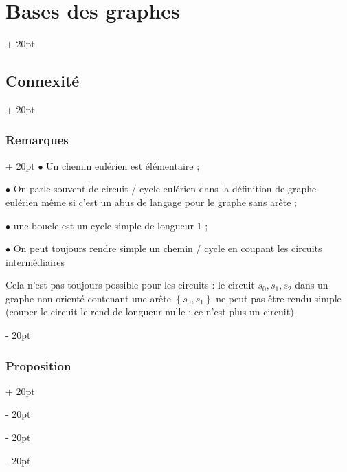 \documentclass[a4paper, 12pt, twoside]{article}
\newcommand{\set}[1]{\left\{ #1 \right\}}
\newcommand{\ind}[1][20pt]{\advance\leftskip + #1}
\newcommand{\deind}[1][20pt]{\advance\leftskip - #1}
\newenvironment{indt}[2][20pt]{#2 \par \ind[#1]}{\par \deind} %
\begin{document}
\begin{indt}{\section{Bases des graphes}}
\begin{indt}{\subsection{Connexité}}
            \vspace{12pt}
            
            \begin{indt}{\subsubsection{Remarques}}
                $\bullet$ Un chemin eulérien est élémentaire ;

                $\bullet$ On parle souvent de circuit / cycle eulérien dans la définition de graphe eulérien même si c'est un abus de langage pour le graphe sans arête ;

                $\bullet$ une boucle est un cycle simple de longueur 1 ;

                $\bullet$ On peut toujours rendre simple un chemin / cycle en coupant les circuits intermédiaires

                \begin{center}
                \end{center}

                Cela n'est pas toujours possible pour les circuits : le circuit $s_0, s_1, s_2$ dans un graphe non-orienté contenant une arête $\set{s_0, s_1}$ ne peut pas être rendu simple (couper le circuit le rend de longueur nulle : ce n'est plus un circuit).
            \end{indt}

            \vspace{12pt}
            
            \begin{indt}{\subsubsection{Proposition}}
                \label{2.2.6}


\end{indt}
\end{indt}
\end{indt}
\end{document}
